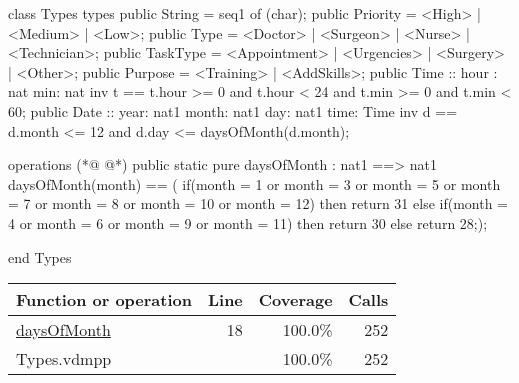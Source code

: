\begin{vdmpp}[breaklines=true]
class Types
types
 public String = seq1 of (char);
 public Priority = <High> | <Medium> | <Low>;
 public Type = <Doctor> | <Surgeon> | <Nurse> | <Technician>;
 public TaskType = <Appointment> | <Urgencies> | <Surgery> | <Other>;
 public Purpose = <Training> | <AddSkills>;
 public Time :: hour : nat
         min: nat
 inv t == t.hour >= 0 and t.hour < 24 and t.min >= 0 and t.min < 60;
 public Date ::  year: nat1
         month: nat1
         day: nat1
         time: Time
 inv d == d.month <= 12 and d.day <= daysOfMonth(d.month);
 
operations
(*@
\label{daysOfMonth:18}
@*)
 public static pure daysOfMonth : nat1 ==> nat1
  daysOfMonth(month) == (
              if(month = 1 or month = 3 or month = 5 or month = 7 or month = 8 or month = 10 or month = 12)
               then return 31
              else if(month = 4 or month = 6 or month = 9 or month = 11)
               then return 30
              else
               return 28;);
                
end Types
\end{vdmpp}
\bigskip
\begin{longtable}{|l|r|r|r|}
\hline
Function or operation & Line & Coverage & Calls \\
\hline
\hline
\hyperref[daysOfMonth:18]{daysOfMonth} & 18&100.0\% & 252 \\
\hline
\hline
Types.vdmpp & & 100.0\% & 252 \\
\hline
\end{longtable}

